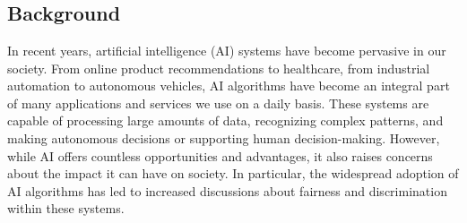 \documentclass[12pt,a4paper,openright,twoside]{book}
\begin{document}
\tableofcontents   
\listoffigures     %
\lstlistoflistings %

\mainmatter

\chapter{\introductionname}
\label{chap:introduction}


\section{Background}
In recent years, artificial intelligence (AI) systems have become pervasive in our society. From online product recommendations to healthcare, from industrial automation to autonomous vehicles, AI algorithms have become an integral part of many applications and services we use on a daily basis. These systems are capable of processing large amounts of data, recognizing complex patterns, and making autonomous decisions or supporting human decision-making.
However, while AI offers countless opportunities and advantages, it also raises concerns about the impact it can have on society. In particular, the widespread adoption of AI algorithms has led to increased discussions about fairness and discrimination within these systems.
\end{document}

